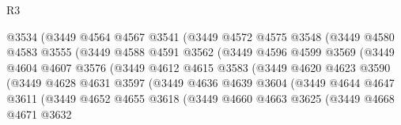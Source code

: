 \begin{lexlean}{R3}
\begin{coremodule}
                          @3534
                          (@3449
                            @4564
                            @4567
                            @3541
                            (@3449
                              @4572
                              @4575
                              @3548
                              (@3449
                                @4580
                                @4583
                                @3555
                                (@3449
                                  @4588
                                  @4591
                                  @3562
                                  (@3449
                                    @4596
                                    @4599
                                    @3569
                                    (@3449
                                      @4604
                                      @4607
                                      @3576
                                      (@3449
                                        @4612
                                        @4615
                                        @3583
                                        (@3449
                                          @4620
                                          @4623
                                          @3590
                                          (@3449
                                            @4628
                                            @4631
                                            @3597
                                            (@3449
                                              @4636
                                              @4639
                                              @3604
                                              (@3449
                                                @4644
                                                @4647
                                                @3611
                                                (@3449
                                                  @4652
                                                  @4655
                                                  @3618
                                                  (@3449
                                                    @4660
                                                    @4663
                                                    @3625
                                                    (@3449
                                                      @4668
                                                      @4671
                                                      @3632

\end{coremodule}
\end{lexlean}
